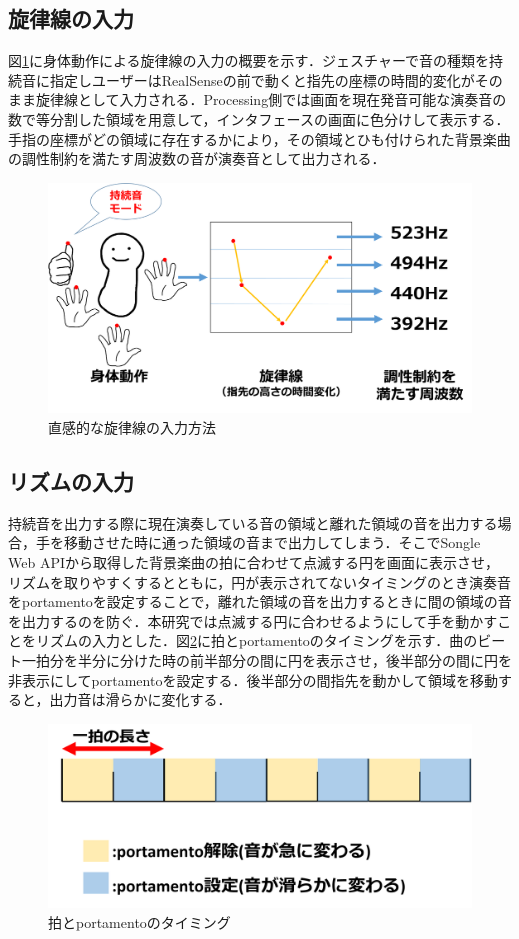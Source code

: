 \subsection{旋律線の入力}
図\ref{img:note1}に身体動作による旋律線の入力の概要を示す．ジェスチャーで音の種類を持続音に指定しユーザーはRealSenseの前で動くと指先の座標の時間的変化がそのまま旋律線として入力される．Processing側では画面を現在発音可能な演奏音の数で等分割した領域を用意して，インタフェースの画面に色分けして表示する．手指の座標がどの領域に存在するかにより，その領域とひも付けられた背景楽曲の調性制約を満たす周波数の音が演奏音として出力される．
\begin{figure}[t]
	\begin{center}
		\includegraphics[width=0.9\linewidth]{./pics/03/in_note.png}
		\caption{直感的な旋律線の入力方法}
		\label{img:note1} 
	\end{center}
\end{figure}
\subsection{リズムの入力}
持続音を出力する際に現在演奏している音の領域と離れた領域の音を出力する場合，手を移動させた時に通った領域の音まで出力してしまう．そこでSongle Web APIから取得した背景楽曲の拍に合わせて点滅する円を画面に表示させ，リズムを取りやすくするとともに，円が表示されてないタイミングのとき演奏音をportamentoを設定することで，離れた領域の音を出力するときに間の領域の音を出力するのを防ぐ．本研究では点滅する円に合わせるようにして手を動かすことをリズムの入力とした．図\ref{img:portamento}に拍とportamentoのタイミングを示す．曲のビート一拍分を半分に分けた時の前半部分の間に円を表示させ，後半部分の間に円を非表示にしてportamentoを設定する．後半部分の間指先を動かして領域を移動すると，出力音は滑らかに変化する．
\begin{figure}[t]
	\begin{center}
		\includegraphics[width=1\linewidth]{./pics/03/portamento.png}
		\caption{拍とportamentoのタイミング}
		\label{img:portamento} 
	\end{center}
\end{figure}

